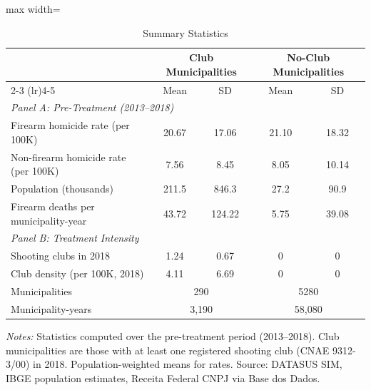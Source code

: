 
\begin{table}[t]
\centering
\caption{Summary Statistics}
\label{tab:summary}
\begin{adjustbox}{max width=\textwidth}
\begin{tabular}{lcccc}
\toprule
 & \multicolumn{2}{c}{Club Municipalities} & \multicolumn{2}{c}{No-Club Municipalities} \\
\cmidrule(lr){2-3} \cmidrule(lr){4-5}
 & Mean & SD & Mean & SD \\
\midrule
\multicolumn{5}{l}{\textit{Panel A: Pre-Treatment (2013--2018)}} \\[3pt]
Firearm homicide rate (per 100K) & 20.67 & 17.06 & 21.10 & 18.32 \\
Non-firearm homicide rate (per 100K) & 7.56 & 8.45 & 8.05 & 10.14 \\
Population (thousands) & 211.5 & 846.3 & 27.2 & 90.9 \\
Firearm deaths per municipality-year & 43.72 & 124.22 & 5.75 & 39.08 \\[6pt]
\multicolumn{5}{l}{\textit{Panel B: Treatment Intensity}} \\[3pt]
Shooting clubs in 2018 & 1.24 & 0.67 & 0 & 0 \\
Club density (per 100K, 2018) & 4.11 & 6.69 & 0 & 0 \\[6pt]
\midrule
Municipalities & \multicolumn{2}{c}{290} & \multicolumn{2}{c}{5280} \\
Municipality-years & \multicolumn{2}{c}{3,190} & \multicolumn{2}{c}{58,080} \\
\bottomrule
\end{tabular}
\end{adjustbox}
\begin{flushleft}\small
\textit{Notes:} Statistics computed over the pre-treatment period (2013--2018). Club municipalities are those with at least one registered shooting club (CNAE 9312-3/00) in 2018. Population-weighted means for rates. Source: DATASUS SIM, IBGE population estimates, Receita Federal CNPJ via Base dos Dados.
\end{flushleft}
\end{table}

